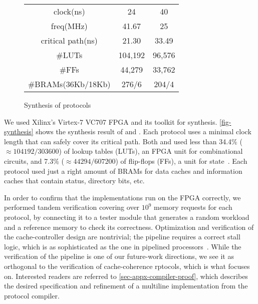 \documentclass[sigplan,10pt,review,anonymous,screen]{acmart}\settopmatter{printfolios=true,printccs=false,printacmref=false}
\begin{document}
\begin{figure}[h]
  \centering\footnotesize
  \begin{tabular}{|c|c|c|}
    \hline
    & \bhemh{} & \bhemt{} \\
    \hline
    clock\;(ns) & 24 & 40 \\
    freq\;(MHz) & 41.67 & 25 \\
    critical path\;(ns) & 21.30 & 33.49 \\
    \#LUTs & 104,192 & 96,576 \\
    \#FFs & 44,279 & 33,762 \\
    \#BRAMs\;(36Kb/18Kb) & 276/6 & 204/4 \\
    \hline
  \end{tabular}
  \caption{Synthesis of \hemiola{} protocols}
  \label{fig-synthesis}
\end{figure}


We used Xilinx's Virtex-7 VC707 FPGA and its toolkit for synthesis.
\autoref{fig-synthesis} shows the synthesis result of \bhemh{} and \bhemt{}.
Each protocol uses a minimal clock length that can safely cover its critical path.
Both \bhemh{} and \bhemt{} used less than 34.4\% ($\approx 104192/303600$) of lookup tables (LUTs), an FPGA unit for combinational circuits, and 7.3\% ($\approx 44294/607200$) of flip-flops (FFs), a unit for state~\cite{vc707}.
Each protocol used just a right amount of BRAMs for data caches and information caches that contain status, directory bits, etc.

In order to confirm that the implementations run on the FPGA correctly, we performed tandem verification covering over $10^9$ memory requests for each protocol, by connecting it to a tester module that generates a random workload and a reference memory to check its correctness.
Optimization and verification of the cache-controller design are nontrivial; the pipeline requires a correct stall logic, which is as sophisticated as the one in pipelined processors~\cite{comarch}.
While the verification of the pipeline is one of our future-work directions, we see it as orthogonal to the verification of cache-coherence rptocols, which is what \hemiola{} focuses on.
Interested readers are referred to \autoref{sec-appx-compiler-proof}, which describes the desired specification and refinement of a multiline implementation from the protocol compiler.
\end{document}
